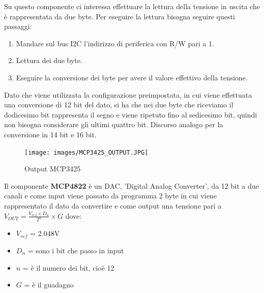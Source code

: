 \documentclass[12pt, a4paper, titlepage, oneside]{book}
\begin{document}
Su questo componente ci interessa effettuare la lettura della tensione in uscita che è rappresentata da due byte. Per eseguire la lettura bisogna seguire questi passaggi:
\begin{enumerate}
    \item Mandare sul bus I2C l'indirizzo di periferica con R/W pari a 1.
    \item Lettura dei due byte.
    \item Eseguire la conversione dei byte per avere il valore effettivo della tensione.
\end{enumerate}

Dato che viene utilizzata la configurazione preimpostata, in cui viene effettuata una conversione di 12 bit del dato, si ha che nei due byte che riceviamo il dodicesimo bit rappresenta il segno e viene ripetuto fino al sedicesimo bit, quindi non bisogna considerare gli ultimi quattro bit.
Discorso analogo per la conversione in 14 bit e 16 bit.

\begin{figure}[h]
    \centering
    \texttt{[image: images/MCP3425\_OUTPUT.JPG]}
    \caption{Output MCP3425}
    \label{fig:MCP3425graph}
\end{figure}

\newpage
Il componente \textbf{MCP4822} è un DAC, 'Digital Analog Converter', da 12 bit a due canali e come input viene passato da programma 2 byte in cui viene rappresentato il dato da convertire e come output una tensione pari a $V_{OUT} = \frac{V_{ref} \times D_n}{2^n} \times G$ dove:
\begin{itemize}
    \item $V_{ref}$ = 2.048V
    \item $D_n$ = sono i bit che passo in input
    \item $n$ = è il numero dei bit, cioè 12
    \item $G$ = è il guadagno
\end{itemize}

\end{document}
